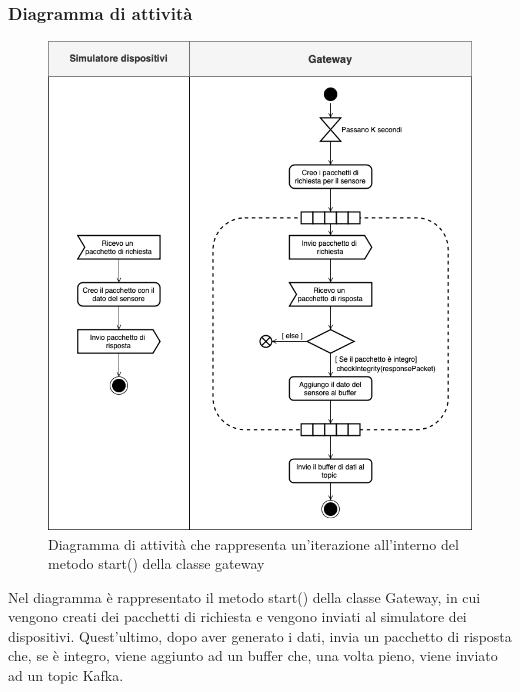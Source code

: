 	\subsubsection{Diagramma di attività}%
		\begin{figure}[H]
			\centering
			\includegraphics[scale=0.500]{res/images/GATEWAY/gateway.start().png}
			\caption{Diagramma di attività che rappresenta un'iterazione all'interno del metodo start() della classe gateway}
			\label{Diagramma 4}
		\end{figure}
		 Nel diagramma è rappresentato il metodo start() della classe Gateway, in cui vengono creati dei pacchetti di richiesta e vengono inviati al simulatore dei dispositivi.
		 \newline
		 Quest'ultimo, dopo aver generato i dati, invia un pacchetto di risposta che, se è integro, viene aggiunto ad un buffer che, una volta pieno, viene inviato ad un topic Kafka.   
		